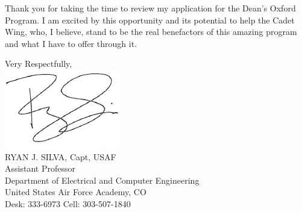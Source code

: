 \documentclass{article}
\begin{document}
Thank you for taking the time to review my application for the Dean's Oxford Program. I am
excited by this opportunity and its potential to help the Cadet Wing, who, I believe, stand to 
be the real benefactors of this amazing program and what I have to offer through it.

\hspace*{2.3in} \noindent Very Respectfully, \\
\hspace*{2.5in} \includegraphics[scale=.5]{silvasig}  \\
\hspace*{2.5in} RYAN J. SILVA, Capt, USAF \\
\hspace*{2.5in} Assistant Professor   \\
\hspace*{2.5in} Department of Electrical and Computer Engineering  \\
\hspace*{2.5in} United States Air Force Academy, CO \\ 
\hspace*{2.5in} Desk: 333-6973 Cell: 303-507-1840

\renewcommand\cfttoctitlefont{\small}
\renewcommand\cftsecfont{\small}
\renewcommand\cftsubsecfont{\small}
\renewcommand\cftsecpagefont{\small}
\renewcommand\cftsubsecpagefont{\small}
\renewcommand\cftsecafterpnum{\setstretch{0.1}}
\renewcommand\cftsubsecafterpnum{\setstretch{0.1}}
\renewcommand\contentsname{\bf Attachments}\tableofcontents

\newpage
\end{document}
